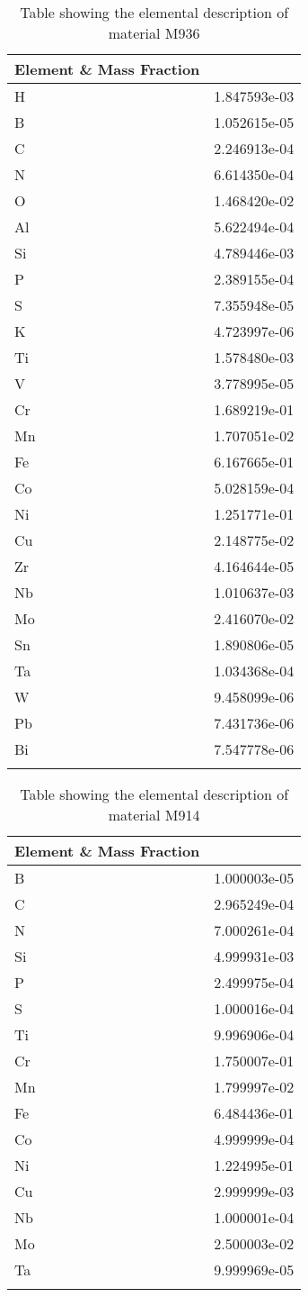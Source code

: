 \begin{centering}
\begin{longtable}[ht!]
{ p{} | p{} }
\hline
Element \& Mass Fraction\\
\hline
H &  1.847593e-03\\
B &  1.052615e-05\\
C &  2.246913e-04\\
N &  6.614350e-04\\
O &  1.468420e-02\\
Al &  5.622494e-04\\
Si &  4.789446e-03\\
P &  2.389155e-04\\
S &  7.355948e-05\\
K &  4.723997e-06\\
Ti &  1.578480e-03\\
V &  3.778995e-05\\
Cr &  1.689219e-01\\
Mn &  1.707051e-02\\
Fe &  6.167665e-01\\
Co &  5.028159e-04\\
Ni &  1.251771e-01\\
Cu &  2.148775e-02\\
Zr &  4.164644e-05\\
Nb &  1.010637e-03\\
Mo &  2.416070e-02\\
Sn &  1.890806e-05\\
Ta &  1.034368e-04\\
W &  9.458099e-06\\
Pb &  7.431736e-06\\
Bi &  7.547778e-06\\
\caption{Table showing the elemental description of material M936}
\label{table:material_ShieldBlock}
\end{longtable}
\clearpage

\begin{longtable}[ht!]
{ p{} | p{} }
\hline
Element \& Mass Fraction\\
\hline
B &  1.000003e-05\\
C &  2.965249e-04\\
N &  7.000261e-04\\
Si &  4.999931e-03\\
P &  2.499975e-04\\
S &  1.000016e-04\\
Ti &  9.996906e-04\\
Cr &  1.750007e-01\\
Mn &  1.799997e-02\\
Fe &  6.484436e-01\\
Co &  4.999999e-04\\
Ni &  1.224995e-01\\
Cu &  2.999999e-03\\
Nb &  1.000001e-04\\
Mo &  2.500003e-02\\
Ta &  9.999969e-05\\
\caption{Table showing the elemental description of material M914}
\label{table:material_UppDucts}
\end{longtable}
\clearpage


\end{centering}
